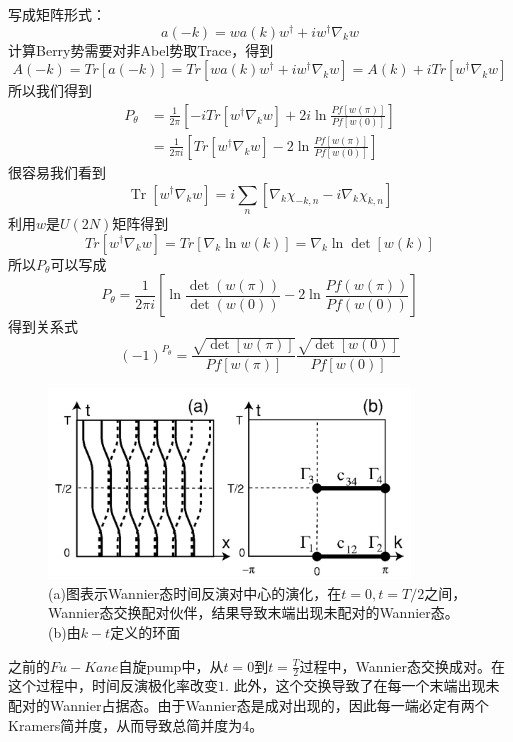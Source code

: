 \documentclass{article}
\numberwithin{equation}{subsection}
\begin{document}
写成矩阵形式：
\begin{equation}
    a(-k)=wa(k)w^\dagger+iw^\dagger\nabla_kw
\end{equation}
计算Berry势需要对非Abel势取Trace，得到
\begin{equation}
    A(-k)=Tr[a(-k)]=Tr[wa(k)w^\dagger+iw^\dagger\nabla_k w]=A(k)+iTr[w^\dagger\nabla_k w]
\end{equation}
所以我们得到
\begin{equation}
    \begin{split}
        P_\theta&=\frac{1}{2\pi}\left[-iTr[w^\dagger\nabla_k w]+2i\ln\frac{Pf[w(\pi)]}{Pf[w(0)]}\right]\\
        &=\frac{1}{2\pi i}\left[Tr[w^\dagger\nabla_k w]-2\ln\frac{Pf[w(\pi)]}{Pf[w(0)]}\right]
    \end{split}
\end{equation}
很容易我们看到
\begin{equation}
    \operatorname{Tr}\left[w^{\dagger} \nabla_{k} w\right]=i \sum_{n}\left[\nabla_{k} \chi_{-k, n}-i \nabla_{k} \chi_{k, n}\right]
\end{equation}
利用$w$是$U(2N)$矩阵得到
\begin{equation}
    Tr[w^\dagger\nabla_k w]=Tr[\nabla_k\ln w(k)]=\nabla_k\ln\det[w(k)]
\end{equation}
所以$P_\theta$可以写成
\begin{equation}
    P_{\theta}=\frac{1}{2\pi i}\left[\ln \frac{\operatorname{det}(w(\pi))}{\operatorname{det}(w(0))}-2 \ln \frac{P f(w(\pi))}{P f(w(0))}\right]
\end{equation}
得到关系式
\begin{equation}
    (-1)^{P_\theta}=\frac{\sqrt{\det[w(\pi)]}}{Pf[w(\pi)]}\frac{\sqrt{\det[w(0)]}}{Pf[w(0)]}
\end{equation}
\begin{figure}[h]
    \centering
    \includegraphics[height=2in]{Fu-Kane.png}
    \caption{(a)图表示Wannier态时间反演对中心的演化，在$t=0,t=T/2$之间，Wannier态交换配对伙伴，结果导致末端出现未配对的Wannier态。(b)由$k-t$定义的环面}
\end{figure}
之前的$Fu-Kane$自旋pump中，从$t=0$到$t=\frac{T}{2}$过程中，Wannier态交换成对。在这个过程中，时间反演极化率改变$1$. 此外，这个交换导致了在每一个末端出现未配对的Wannier占据态。由于Wannier态是成对出现的，因此每一端必定有两个Kramers简并度，从而导致总简并度为4。
\end{document}
